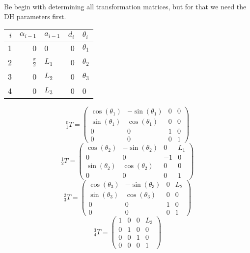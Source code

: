 \documentclass[10pt,a4paper]{article}
\begin{document}
Be begin with determining all transformation matrices, but for that we need the DH parameters first.

\begin{tabular}{rrlrl}
$i$ & $\alpha_{i - 1}$ & $a_{i - 1}$ & $d_i$ & $\theta_i$\\
\hline
1 & 0 & 0 & 0 & $\theta_{1}$\\
2 & $\frac{\pi}{2}$ & $L_{1}$ & 0 & $\theta_{2}$\\
3 & 0 & $L_{2}$ & 0 & $\theta_{3}$\\
4 & 0 & $L_{3}$ & 0 & 0\\
\end{tabular}
\begin{comment}
  #+ORGTBL: SEND 2-dh-parameters orgtbl-to-latex :splice nil :skip 0 :raw t
  | $i$ | $\alpha_{i - 1}$ | $a_{i - 1}$ | $d_i$ | $\theta_i$   |
  |-----+------------------+-------------+-------+--------------|
  |   1 |                0 | 0           |     0 | $\theta_{1}$ |
  |   2 |  $\frac{\pi}{2}$ | $L_{1}$     |     0 | $\theta_{2}$ |
  |   3 |                0 | $L_{2}$     |     0 | $\theta_{3}$ |
  |   4 |                0 | $L_{3}$     |     0 | 0            |
\end{comment}

\begin{equation*}
  {}_{1}^{0}T = \begin{pmatrix}
    \cos(\theta_{1}) & -\sin(\theta_{1}) & 0 & 0\\
    \sin(\theta_{1}) & \cos(\theta_{1}) & 0 & 0\\
    0 & 0 & 1 & 0\\
    0 & 0 & 0 & 1
  \end{pmatrix}
\end{equation*}
\begin{equation*}
  {}_{2}^{1}T = \begin{pmatrix}
    \cos(\theta_{2}) & -\sin(\theta_{2}) & 0 & L_{1}\\
    0 & 0 & -1 & 0\\
    \sin(\theta_{2}) & \cos(\theta_{2}) & 0 & 0\\
    0 & 0 & 0 & 1
  \end{pmatrix}
\end{equation*}
\begin{equation*}
  {}_{3}^{2}T = \begin{pmatrix}
    \cos(\theta_{3}) & -\sin(\theta_{3}) & 0 & L_{2}\\
    \sin(\theta_{3}) & \cos(\theta_{3}) & 0 & 0\\
    0 & 0 & 1 & 0\\
    0 & 0 & 0 & 1
  \end{pmatrix}
\end{equation*}
\begin{equation*}
  {}_{4}^{3}T = \begin{pmatrix}
    1 & 0 & 0 & L_{3}\\
    0 & 1 & 0 & 0\\
    0 & 0 & 1 & 0\\
    0 & 0 & 0 & 1
  \end{pmatrix}
\end{equation*}
\end{document}
